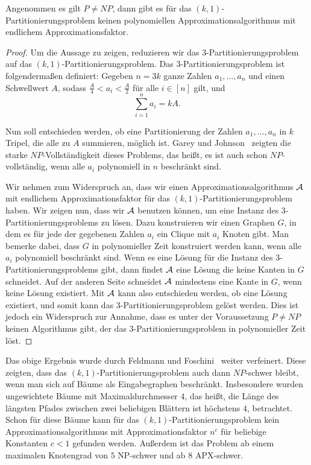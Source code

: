 \begin{thm}\label{thm:np_comp}
    Angenommen es gilt $P \neq NP$, dann gibt es für das $(k,1)$\hyp Partitionierungsproblem keinen polynomiellen Approximationsalgorithmus mit endlichem Approximationsfaktor.
\end{thm}
\begin{proof}
    Um die Aussage zu zeigen, reduzieren wir das $3$\hyp Partitionierungsproblem auf das $(k,1)$\hyp Partitionierungsproblem. 
    Das $3$\hyp Partitionierungsproblem ist folgendermaßen definiert: Gegeben $n = 3k$ ganze Zahlen $a_1,\ldots, a_n$ und einen Schwellwert $A$, sodass $\frac{A}{4} < a_i < \frac{A}{2}$ für alle $i \in [n]$ gilt, und 
    \begin{equation*}
        \sum_{i=1}^{n} a_i = kA.
    \end{equation*}

    Nun soll entschieden werden, ob eine Partitionierung der Zahlen $a_1, \ldots, a_n$ in $k$ Tripel, die alle zu $A$ summieren, möglich ist. 
    Garey und Johnson~\parencite{gj79} zeigten die starke $NP$\hyp Vollständigkeit dieses Problems, das heißt, es ist auch schon $NP$\hyp vollständig, wenn alle $a_i$ polynomiell in $n$ beschränkt sind.

    Wir nehmen zum Widerspruch an, dass wir einen Approximationsalgorithmus $\mathcal{A}$ mit endlichem Approximationsfaktor für das $(k,1)$\hyp Partitionierungsproblem haben. 
    Wir zeigen nun, dass wir $\mathcal{A}$ benutzen können, um eine Instanz des $3$\hyp Partitionierungsproblems zu lösen.
    Dazu konstruieren wir einen Graphen $G$, in dem es für jede der gegebenen Zahlen $a_i$ ein Clique mit $a_i$ Knoten gibt.
	Man bemerke dabei, dass $G$ in polynomieller Zeit konstruiert werden kann, wenn alle $a_i$ polynomiell beschränkt sind.
    Wenn es eine Lösung für die Instanz des $3$\hyp Partitionierungsproblems gibt, dann findet $\mathcal{A}$ eine Lösung die keine Kanten in $G$ schneidet. 
    Auf der anderen Seite schneidet $\mathcal{A}$ mindestens eine Kante in $G$, wenn keine Lösung existiert.
    Mit $\mathcal{A}$ kann also entschieden werden, ob eine Lösung existiert, und somit kann das $3$\hyp Partitionierungsproblem gelöst werden.
    Dies ist jedoch ein Widerspruch zur Annahme, dass es unter der Voraussetzung $P \neq NP$ keinen Algorithmus gibt, der das $3$\hyp Partitionierungsproblem in polynomieller Zeit löst.
\end{proof}

\begin{rem}
    Das obige Ergebnis wurde durch Feldmann und Foschini~\parencite{FF15} weiter verfeinert. 
    Diese zeigten, dass das $(k,1)$\hyp Partitionierungsproblem auch dann $NP$\hyp schwer bleibt, wenn man sich auf Bäume als Eingabegraphen beschränkt.
    Insbesondere wurden ungewichtete Bäume mit Maximaldurchmesser $4$, das heißt, die Länge des längsten Pfades zwischen zwei beliebigen Blättern ist höchstens $4$, betrachtet.
    Schon für diese Bäume kann für das $(k,1)$\hyp Partitionierungsproblem kein Approximationsalgorithmus mit Approximationsfaktor $n^c$ für beliebige Konstanten $c < 1$ gefunden werden.
    Außerdem ist das Problem ab einem maximalen Knotengrad von $5$ NP-schwer und ab $8$ APX-schwer.
\end{rem}


